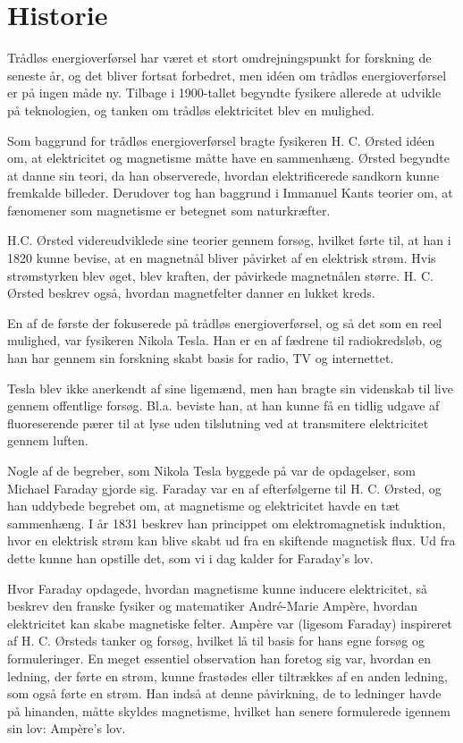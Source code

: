 \section{Historie}

Trådløs energioverførsel har været et stort omdrejningspunkt for forskning de seneste år, og det bliver fortsat forbedret, men idéen om trådløs energioverførsel er på ingen måde ny. Tilbage i 1900-tallet begyndte fysikere allerede at udvikle på teknologien, og tanken om trådløs elektricitet blev en mulighed.

Som baggrund for trådløs energioverførsel bragte fysikeren H. C. Ørsted idéen om, at elektricitet og magnetisme måtte have en sammenhæng. Ørsted begyndte at danne sin teori, da han observerede, hvordan elektrificerede sandkorn kunne fremkalde billeder. Derudover tog han baggrund i Immanuel Kants teorier om, at fænomener som magnetisme er betegnet som naturkræfter.

H.C. Ørsted videreudviklede sine teorier gennem forsøg, hvilket førte til, at han i 1820 kunne bevise, at en magnetnål bliver påvirket af en elektrisk strøm. Hvis strømstyrken blev øget, blev kraften, der påvirkede magnetnålen større. H. C. Ørsted beskrev også, hvordan magnetfelter danner en lukket kreds.

En af de første der fokuserede på trådløs energioverførsel, og så det som en reel mulighed, var fysikeren Nikola Tesla. Han er en af fædrene til radiokredsløb, og han har gennem sin forskning skabt basis for radio, TV og internettet.

Tesla blev ikke anerkendt af sine ligemænd, men han bragte sin videnskab til live gennem offentlige forsøg. Bl.a. beviste han, at han kunne få en tidlig udgave af fluoreserende pærer til at lyse uden tilslutning ved at transmitere elektricitet gennem luften.

Nogle af de begreber, som Nikola Tesla byggede på var de opdagelser, som Michael Faraday gjorde sig. Faraday var en af efterfølgerne til H. C. Ørsted, og han uddybede begrebet om, at magnetisme og elektricitet havde en tæt sammenhæng. I år 1831 beskrev han princippet om elektromagnetisk induktion, hvor en elektrisk strøm kan blive skabt ud fra en skiftende magnetisk flux. Ud fra dette kunne han opstille det, som vi i dag kalder for Faraday's lov.

Hvor Faraday opdagede, hvordan magnetisme kunne inducere elektricitet, så beskrev den franske fysiker og matematiker André-Marie Ampère, hvordan elektricitet kan skabe magnetiske felter. Ampère var (ligesom Faraday) inspireret af H. C. Ørsteds tanker og forsøg, hvilket lå til basis for hans egne forsøg og formuleringer. En meget essentiel observation han foretog sig var, hvordan en ledning, der førte en strøm, kunne frastødes eller tiltrækkes af en anden ledning, som også førte en strøm. Han indså at denne påvirkning, de to ledninger havde på hinanden, måtte skyldes magnetisme, hvilket han senere formulerede igennem sin lov: Ampère's lov.

